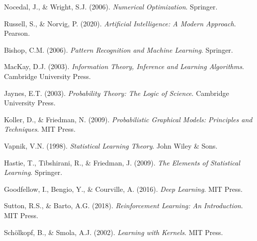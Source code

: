 \documentclass[11pt]{article}
\begin{document}
\begin{thebibliography}{99}
Nocedal, J., \& Wright, S.J. (2006). \textit{Numerical Optimization}. Springer.

Russell, S., \& Norvig, P. (2020). \textit{Artificial Intelligence: A Modern Approach}. Pearson.

Bishop, C.M. (2006). \textit{Pattern Recognition and Machine Learning}. Springer.

MacKay, D.J. (2003). \textit{Information Theory, Inference and Learning Algorithms}. Cambridge University Press.

Jaynes, E.T. (2003). \textit{Probability Theory: The Logic of Science}. Cambridge University Press.

Koller, D., \& Friedman, N. (2009). \textit{Probabilistic Graphical Models: Principles and Techniques}. MIT Press.

Vapnik, V.N. (1998). \textit{Statistical Learning Theory}. John Wiley \& Sons.

Hastie, T., Tibshirani, R., \& Friedman, J. (2009). \textit{The Elements of Statistical Learning}. Springer.

Goodfellow, I., Bengio, Y., \& Courville, A. (2016). \textit{Deep Learning}. MIT Press.

Sutton, R.S., \& Barto, A.G. (2018). \textit{Reinforcement Learning: An Introduction}. MIT Press.

Schölkopf, B., \& Smola, A.J. (2002). \textit{Learning with Kernels}. MIT Press.

\end{thebibliography}
\end{document}
